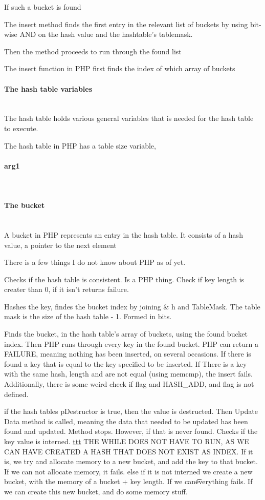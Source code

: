 \documentclass[titlepage]{article}
\newcommand{\myparagraph}[1]{\paragraph{#1}\mbox{}\\}
\begin{document}
	If such a bucket is found
	 
	
	
	The insert method finds the first entry in the relevant list of buckets by using bit-wise AND on the hash value and the hashtable's tablemask. 
	
	Then the method proceeds to run through the found list 
	
	
	The insert function in PHP first finds the index of which array of buckets 
	
	
	\myparagraph{The hash table variables}
	The hash table holds various general variables that is needed for the hash table to execute. 
	
	The hash table in PHP has a table size variable,
	
	\myparagraph{arg1}
	
	\myparagraph{The bucket}
	A bucket in PHP represents an entry in the hash table. 
	It consists of a hash value, a pointer to the next element  
	
	
	There is a few things I do not know about PHP as of yet. 
	
	Checks if the hash table is consistent. Is a PHP thing.
	Check if key length is creater than 0, if it isn't returns failure.
	
	Hashes the key,
	findes the bucket index by joining \& h and TableMask.
	The table mask is the size of the hash table - 1. Formed in bits.
	
	Finds the bucket, in the hash table's array of buckets, using the found bucket index.
	Then PHP runs through every key in the found bucket.
	PHP can return a FAILURE, meaning nothing has been inserted, on several occasions. 
	If there is found a key that is equal to the key specified to be inserted. If There is a key with the same hash, length and are not equal (using memcmp), the insert fails. 
	Additionally, there is some weird check if flag and HASH\_ADD, and flag is not defined.
	
	
	if the hash tables pDestructor is true, then the value is destructed. 
	Then Update Data method is called, meaning the data that needed to be updated has been found and updated.
	Method stops.
	However, if that is never found.
	Checks if the key value is interned. \href{http://en.wikipedia.org/wiki/String_interning}{ttt}
	THE WHILE DOES NOT HAVE TO RUN, AS WE CAN HAVE CREATED A HASH THAT DOES NOT EXIST AS INDEX.
	If it is, we try and allocate memory to a new bucket, and add the key to that bucket. If we can not allocate memory, it fails.
	else if it is not interned we create a new bucket, with the memory of a bucket + key length.	
	If we can\t everything fails.
	If we can create this new bucket, and do some memory stuff.
	
\end{document}
